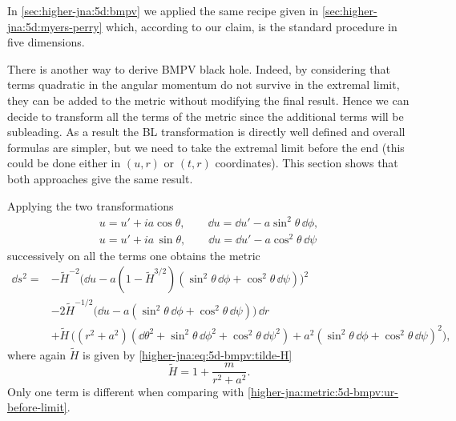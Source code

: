 In \cref{sec:higher-jna:5d:bmpv} we applied the same recipe given in \cref{sec:higher-jna:5d:myers-perry} which, according to our claim, is the standard procedure in five dimensions.

There is another way to derive BMPV black hole.
Indeed, by considering that terms quadratic in the angular momentum do not survive in the extremal limit, they can be added to the metric without modifying the final result.
Hence we can decide to transform all the terms of the metric\footnotemark{} since the additional terms will be subleading.%
As a result the BL transformation is directly well defined and overall formulas are simpler, but we need to take the extremal limit before the end (this could be done either in $(u, r)$ or $(t, r)$ coordinates).
This section shows that both approaches give the same result.

Applying the two transformations
\begin{subequations}
\begin{gather}
	u = u' + i a \cos \theta, \qquad
	\dd u = \dd u' - a \sin^2 \theta\, \dd\phi, \\
	u = u' + i a\, \sin \theta, \qquad
	\dd u = \dd u' - a \cos^2 \theta\, \dd\psi
\end{gather}
\end{subequations}
successively on all the terms one obtains the metric
\begin{equation}
	\begin{aligned}
		\dd s^2 = &- \tilde H^{-2} \big(\dd u
				- a (1 - \tilde H^{3/2}) (\sin^2 \theta\, \dd\phi + \cos^2 \theta\, \dd\psi) \big)^2 \\
			&- 2 \tilde H^{-1/2} \big(\dd u - a (\sin^2 \theta\, \dd\phi + \cos^2 \theta\, \dd\psi) \big)\, \dd r \\
			&+ \tilde H\, \Big(
				(r^2 + a^2) (\dd \theta^2 + \sin^2 \theta\, \dd\phi^2 + \cos^2 \theta\, \dd\psi^2)
				+ a^2 (\sin^2 \theta\, \dd\phi + \cos^2 \theta\, \dd\psi)^2 \Big),
	\end{aligned}
\end{equation} 
where again $\tilde H$ is given by \eqref{higher-jna:eq:5d-bmpv:tilde-H}
\begin{equation}
	\tilde H = 1 + \frac{m}{r^2 + a^2}.
\end{equation} 
Only one term is different when comparing with \eqref{higher-jna:metric:5d-bmpv:ur-before-limit}.


